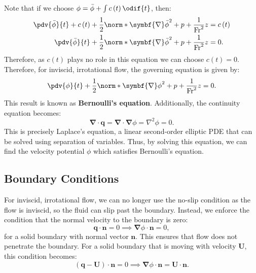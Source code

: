 \documentclass{article}
\theoremstyle{definition}
\begin{document}
Note that if we choose
\(\phi = \bar{\phi} + \int c\left( t \right) \odif{t}\), then:
\begin{align*}
    \pdv{\bar{\phi}}{t} + c\left( t \right) + \frac{1}{2} \norm*{\symbf{\nabla} \bar{\phi}}^2 + p + \frac{1}{\mathrm{Fr}^2} z & = c\left( t \right) \\
    \pdv{\bar{\phi}}{t} + \frac{1}{2} \norm*{\symbf{\nabla} \bar{\phi}}^2 + p + \frac{1}{\mathrm{Fr}^2} z                     & = 0.
\end{align*}
Therefore, as \(c\left( t \right)\) plays no role in this equation
we can choose \(c\left( t \right) = 0\). Therefore, for inviscid,
irrotational flow, the governing equation is given by:
\begin{equation*}
    \pdv{\phi}{t} + \frac{1}{2} \norm*{\symbf{\nabla} \phi}^2 + p + \frac{1}{\mathrm{Fr}^2} z = 0.
\end{equation*}
This result is known as \textbf{Bernoulli's equation}. Additionally,
the continuity equation becomes:
\begin{equation*}
    \symbf{\nabla} \cdot \symbf{q} = \symbf{\nabla} \cdot \symbf{\nabla} \phi = \nabla^2 \phi = 0.
\end{equation*}
This is precisely Laplace's equation, a linear second-order elliptic
PDE that can be solved using separation of variables. Thus, by solving
this equation, we can find the velocity potential \(\phi\) which satisfies
Bernoulli's equation.
\subsection{Boundary Conditions}
For inviscid, irrotational flow, we can no longer use the no-slip
condition as the flow is inviscid, so the fluid can slip past the
boundary. Instead, we enforce the condition that the normal velocity to
the boundary is zero:
\begin{equation*}
    \symbf{q} \cdot \symbf{n} = 0 \implies \symbf{\nabla} \phi \cdot \symbf{n} = 0,
\end{equation*}
for a solid boundary with normal vector \(\symbf{n}\). This ensures that
flow does not penetrate the boundary. For a solid boundary that is
moving with velocity \(\symbf{U}\), this condition
becomes:
\begin{equation*}
    \left( \symbf{q} - \symbf{U} \right) \cdot \symbf{n} = 0 \implies \symbf{\nabla} \phi \cdot \symbf{n} = \symbf{U} \cdot \symbf{n}.
\end{equation*}
\end{document}
